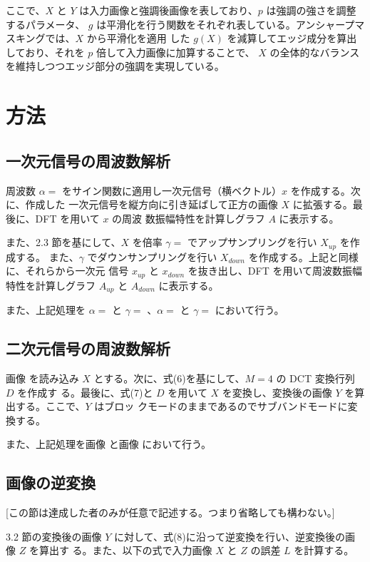 \documentclass[dvipdfmx]{jsarticle}
\begin{document}
ここで、$X$ と $Y$ は入力画像と強調後画像を表しており、$p$ は強調の強さを調整するパラメータ、
$g$ は平滑化を行う関数をそれぞれ表している。アンシャープマスキングでは、$X$ から平滑化を適用
した $g(X)$ を減算してエッジ成分を算出しており、それを $p$ 倍して入力画像に加算することで、
$X$ の全体的なバランスを維持しつつエッジ部分の強調を実現している。
\section{方法}

\subsection{一次元信号の周波数解析}

周波数 $\alpha =$ をサイン関数に適用し一次元信号（横ベクトル）$x$ を作成する。次に、作成した
一次元信号を縦方向に引き延ばして正方の画像 $X$ に拡張する。最後に、DFT を用いて $x$ の周波
数振幅特性を計算しグラフ $A$ に表示する。

また、2.3 節を基にして、$X$ を倍率 $\gamma =$ でアップサンプリングを行い $X_{up}$ を作成する。
また、$\gamma$ でダウンサンプリングを行い $X_{down}$ を作成する。上記と同様に、それらから一次元
信号 $x_{up}$ と $x_{down}$ を抜き出し、DFT を用いて周波数振幅特性を計算しグラフ $A_{up}$ と
$A_{down}$ に表示する。

また、上記処理を $\alpha =$ と $\gamma =$ 、$\alpha =$ と $\gamma =$ において行う。

\subsection{二次元信号の周波数解析}

画像 を読み込み $X$ とする。次に、式(6)を基にして、$M=4$ の DCT 変換行列 $D$ を作成す
る。最後に、式(7)と $D$ を用いて $X$ を変換し、変換後の画像 $Y$ を算出する。ここで、$Y$ はブロッ
クモードのままであるのでサブバンドモードに変換する。

また、上記処理を画像 と画像 において行う。

\subsection{画像の逆変換}

[この節は達成した者のみが任意で記述する。つまり省略しても構わない。]

3.2 節の変換後の画像 $Y$ に対して、式(8)に沿って逆変換を行い、逆変換後の画像 $Z$ を算出す
る。また、以下の式で入力画像 $X$ と $Z$ の誤差 $L$ を計算する。
\end{document}
